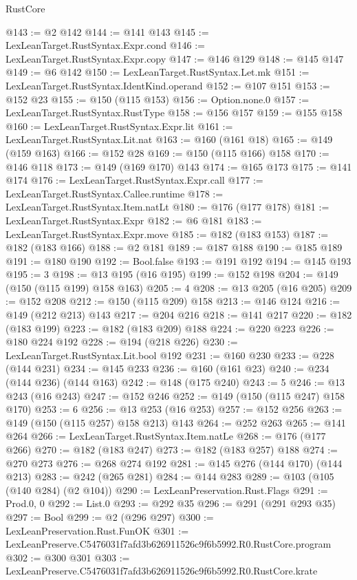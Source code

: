 \begin{lexlean}{RustCore}
\begin{coremodule}
@143 := @2 @142
@144 := @141 @143
@145 := LexLeanTarget.RustSyntax.Expr.cond
@146 := LexLeanTarget.RustSyntax.Expr.copy
@147 := @146 @129
@148 := @145 @147
@149 := @6 @142
@150 := LexLeanTarget.RustSyntax.Let.mk
@151 := LexLeanTarget.RustSyntax.IdentKind.operand
@152 := @107 @151
@153 := @152 @23
@155 := @150 (@115 @153)
@156 := Option.none.{0}
@157 := LexLeanTarget.RustSyntax.RustType
@158 := @156 @157
@159 := @155 @158
@160 := LexLeanTarget.RustSyntax.Expr.lit
@161 := LexLeanTarget.RustSyntax.Lit.nat
@163 := @160 (@161 @18)
@165 := @149 (@159 @163)
@166 := @152 @28
@169 := @150 (@115 @166) @158
@170 := @146 @118
@173 := @149 (@169 @170) @143
@174 := @165 @173
@175 := @141 @174
@176 := LexLeanTarget.RustSyntax.Expr.call
@177 := LexLeanTarget.RustSyntax.Callee.runtime
@178 := LexLeanTarget.RustSyntax.Item.natLt
@180 := @176 (@177 @178)
@181 := LexLeanTarget.RustSyntax.Expr
@182 := @6 @181
@183 := LexLeanTarget.RustSyntax.Expr.move
@185 := @182 (@183 @153)
@187 := @182 (@183 @166)
@188 := @2 @181
@189 := @187 @188
@190 := @185 @189
@191 := @180 @190
@192 := Bool.false
@193 := @191 @192
@194 := @145 @193
@195 := 3
@198 := @13 @195 (@16 @195)
@199 := @152 @198
@204 := @149 (@150 (@115 @199) @158 @163)
@205 := 4
@208 := @13 @205 (@16 @205)
@209 := @152 @208
@212 := @150 (@115 @209) @158
@213 := @146 @124
@216 := @149 (@212 @213) @143
@217 := @204 @216
@218 := @141 @217
@220 := @182 (@183 @199)
@223 := @182 (@183 @209) @188
@224 := @220 @223
@226 := @180 @224 @192
@228 := @194 (@218 @226)
@230 := LexLeanTarget.RustSyntax.Lit.bool @192
@231 := @160 @230
@233 := @228 (@144 @231)
@234 := @145 @233
@236 := @160 (@161 @23)
@240 := @234 (@144 @236) (@144 @163)
@242 := @148 (@175 @240)
@243 := 5
@246 := @13 @243 (@16 @243)
@247 := @152 @246
@252 := @149 (@150 (@115 @247) @158 @170)
@253 := 6
@256 := @13 @253 (@16 @253)
@257 := @152 @256
@263 := @149 (@150 (@115 @257) @158 @213) @143
@264 := @252 @263
@265 := @141 @264
@266 := LexLeanTarget.RustSyntax.Item.natLe
@268 := @176 (@177 @266)
@270 := @182 (@183 @247)
@273 := @182 (@183 @257) @188
@274 := @270 @273
@276 := @268 @274 @192
@281 := @145 @276 (@144 @170) (@144 @213)
@283 := @242 (@265 @281)
@284 := @144 @283
@289 := @103 (@105 (@140 @284) (@2 @104))
@290 := LexLeanPreservation.Rust.Flags
@291 := Prod.{0, 0}
@292 := List.{0}
@293 := @292 @35
@296 := @291 (@291 @293 @35)
@297 := Bool
@299 := @2 (@296 @297)
@300 := LexLeanPreservation.Rust.FunOK
@301 := LexLeanPreserve.C5476031f7afd3b626911526c9f6b5992.R0.RustCore.program
@302 := @300 @301
@303 := LexLeanPreserve.C5476031f7afd3b626911526c9f6b5992.R0.RustCore.krate

\end{coremodule}
\end{lexlean}
